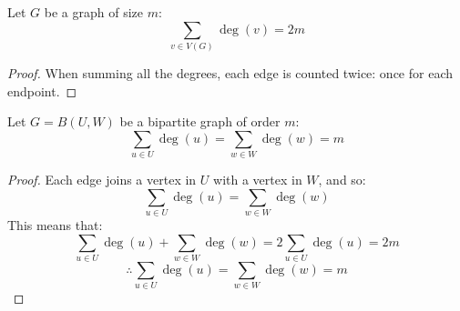 \documentclass[letterpaper,12pt,fleqn]{article}
\begin{document}
\begin{theorem}
  Let \(G\) be a graph of size \(m\):
  \[\sum_{v\in V(G)}\deg(v)=2m\]
\end{theorem}

\begin{proof}
  When summing all the degrees, each edge is counted twice: once for each endpoint.
\end{proof}

\begin{corollary}
  Let \(G=B(U,W)\) be a bipartite graph of order \(m\):
  \[\sum_{u\in U}\deg(u)=\sum_{w\in W}\deg(w)=m\]
\end{corollary}

\begin{proof}
  Each edge joins a vertex in \(U\) with a vertex in \(W\), and so:
  \[\sum_{u\in U}\deg(u)=\sum_{w\in W}\deg(w)\]
  This means that:
  \[\sum_{u\in U}\deg(u)+\sum_{w\in W}\deg(w)=2\sum_{u\in U}\deg(u)=2m\]
  \[\therefore\sum_{u\in U}\deg(u)=\sum_{w\in W}\deg(w)=m\]
\end{proof}
\end{document}
